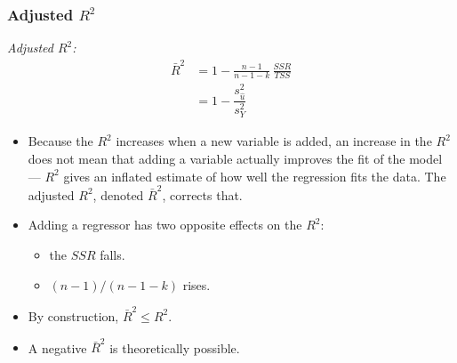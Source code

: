 \begin{frame}
\frametitle{Adjusted $R^{2}$}
\emph{Adjusted $R^{2}$:} 
\begin{align*}
\bar{R}^{2} 
    & = 1-\frac{n-1}{n-1-k}\,\frac{SSR}{TSS}\\[1ex]
    & = 1-\dfrac{s_{\hat{u}}^{2}}{s_{Y}^{2}}
\end{align*}
\begin{itemize}
\item Because the $R^{2}$ increases when a new variable is added, an increase in the $R^{2}$ does not mean that adding a variable actually improves the fit of the model --- $R^{2}$ gives an inflated estimate of how well the regression fits the data. The adjusted $R^{2}$, denoted $\bar{R}^{2}$, corrects that. 
\item Adding a regressor has two opposite effects on the $R^{2}$: 
\begin{itemize}
\item the $SSR$ falls.
\item $(n-1)/(n-1-k)$ rises.
\end{itemize}
\item By construction, $\bar{R}^{2} \leq R^{2}$.
\item A negative $\bar{R}^{2}$ is theoretically possible. 
\end{itemize}
\end{frame}

